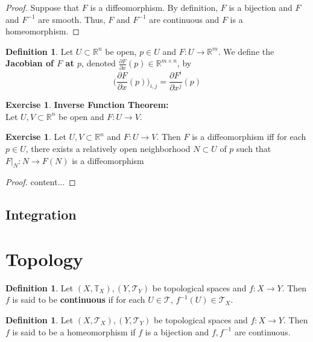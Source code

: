 \documentclass{book}
\theoremstyle{definition}
\newtheorem{defn}[definition]{Definition}
\newtheorem{ex}[definition]{Exercise}
\newcommand{\R}{\mathbb{R}}
\newcommand{\T}{\mathbb{T}}
\newcommand{\MT}{\mathcal{T}}
\DeclareMathOperator*{\0}{\mbf{0}}
\DeclareMathOperator*{\1}{\mbf{1}}
\newcommand{\p}{\partial}
\begin{document}
	\begin{proof}
	Suppose that $F$ is a diffeomorphism. By definition, $F$ is a bijection and $F$ and $F^{-1}$ are smooth. Thus, $F$ and $F^{-1}$ are continuous and $F$ is a homeomorphism.
	\end{proof}
	
	\begin{defn}
	Let $U \subset \R^n$ be open, $p \in U$ and $F: U \rightarrow \R^m$. We define the \textbf{Jacobian of $F$ at $p$}, denoted $\frac{\p F}{\p x}(p) \in \R^{m \times n}$, by $$\bigg (\frac{\p F}{\p x}(p) \bigg )_{i,j} = \frac{\p F^i}{\p x^j}(p)$$
	\end{defn}
	
	\begin{ex}\textbf{Inverse Function Theorem:}\\
	Let $U,V \subset \R^n$ be open and $F: U \rightarrow V$.
	\end{ex}
	
	\begin{ex}
		Let $U,V \subset \R^n$ and $F: U \rightarrow V$. Then $F$ is a diffeomorphism iff for each $p \in U$, there exists a relatively open neighborhood $N \subset U$ of $p$ such that $F|_N:N \rightarrow F(N)$ is a diffeomorphism
	\end{ex}
	
	\begin{proof}
		content...
	\end{proof}

	
	\subsection{Integration}














\newpage
\section{Topology}

\begin{defn}
Let $(X, \T_X), (Y, \MT_Y)$ be topological spaces and $f:X\rightarrow Y$. Then $f$ is said to be \textbf{continuous} if for each $U \in \MT$, $f^{-1}(U) \in \MT_X$.
\end{defn}

\begin{defn}
Let $(X, \MT_X), (Y, \MT_Y)$ be topological spaces and $f:X\rightarrow Y$. Then $f$ is said to be a homeomorphism if $f$ is a bijection and $f, f^{-1}$ are continuous. 
\end{defn}
\end{document}
